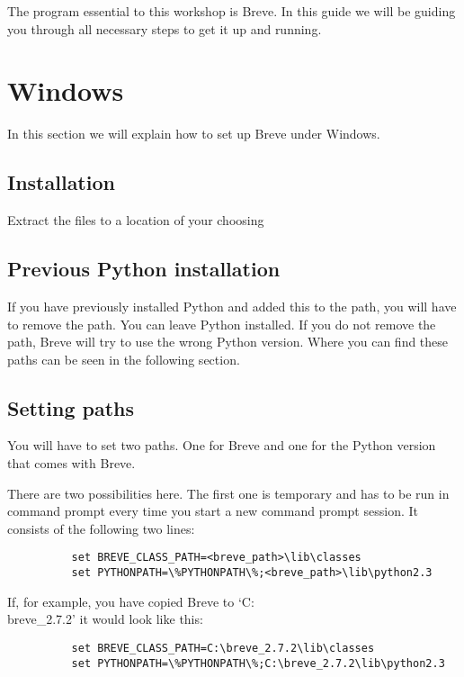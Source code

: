 
The program essential to this workshop is Breve. In this guide we will be guiding you through all necessary steps to get it up and running. 

\section{Windows}
	In this section we will explain how to set up Breve under Windows.

\subsection{Installation}
	Extract the files to a location of your choosing

\subsection{Previous Python installation}
	If you have previously installed Python and added this to the path, you will have to remove the path. You can leave Python installed. If you do not remove the path, Breve will try to use the wrong Python version. Where you can find these paths can be seen in the following section.

\subsection{Setting paths}
	You will have to set two paths. One for Breve and one for the Python version that comes with Breve.

	There are two possibilities here. The first one is temporary and has to be run in command prompt every time you start a new command prompt session. It consists of the following two lines:
	\begin{verbatim}
		  set BREVE_CLASS_PATH=<breve_path>\lib\classes
		  set PYTHONPATH=\%PYTHONPATH\%;<breve_path>\lib\python2.3
	\end{verbatim}
	If, for example, you have copied Breve to `C:\\breve\_2.7.2' it would look like this:
	\begin{verbatim}
		  set BREVE_CLASS_PATH=C:\breve_2.7.2\lib\classes
		  set PYTHONPATH=\%PYTHONPATH\%;C:\breve_2.7.2\lib\python2.3
	\end{verbatim}

